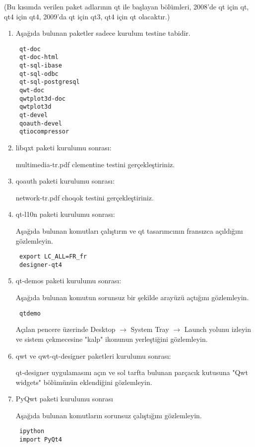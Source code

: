 \documentclass[a4paper,10pt]{article}
\begin{document}
(Bu kısımda verilen paket adlarının qt ile başlayan bölümleri, 2008'de qt için qt, qt4 için qt4, 2009'da qt için qt3, qt4 için qt olacaktır.)
\begin{enumerate}
 \item Aşağıda bulunan paketler sadece kurulum testine tabidir.
\begin{verbatim}
 qt-doc
 qt-doc-html
 qt-sql-ibase
 qt-sql-odbc
 qt-sql-postgresql
 qwt-doc
 qwtplot3d-doc
 qwtplot3d
 qt-devel
 qoauth-devel
 qtiocompressor
\end{verbatim}

\item libqxt paketi kurulumu sonrası:

multimedia-tr.pdf clementine testini gerçekleştiriniz.

\item qoauth paketi kurulumu sonrası:

network-tr.pdf choqok testini gerçekleştiriniz.

\item qt-l10n paketi kurulumu sonrası:

Aşağıda bulunan komutları çalıştırın ve qt tasarımcının fransızca açıldığını gözlemleyin.
\begin{verbatim}
 export LC_ALL=FR_fr
 designer-qt4
\end{verbatim}

\item  qt-demos paketi kurulumu sonrası:

Aşağıda bulunan komutun sorunsuz bir şekilde arayüzü açtığını gözlemleyin.
\begin{verbatim}
 qtdemo
\end{verbatim}

Açılan pencere üzerinde Desktop $\rightarrow$ System Tray $\rightarrow$ Launch yolunu izleyin ve sistem çekmecesine "kalp" ikonunun yerleştiğini gözlemleyin.

\item qwt ve qwt-qt-designer paketleri kurulumu sonrası:

qt-designer uygulamasını açın ve sol tarfta bulunan parçacık kutusuna "Qwt widgets" bölümünün eklendiğini gözlemleyin.

\item PyQwt paketi kurulumu sonrası

Aşağıda bulunan komutların sorunsuz çalıştığını gözlemleyin.
\begin{verbatim}
 ipython
 import PyQt4
\end{verbatim}



\end{enumerate}
\end{document}
